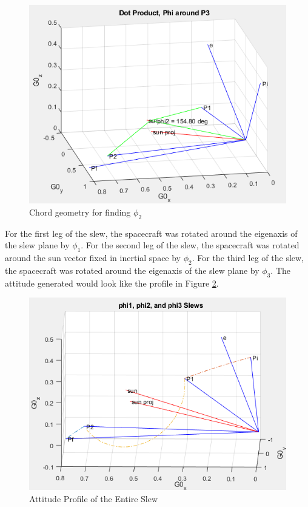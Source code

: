 \documentclass[letterpaper, preprint, paper,11pt]{AAS}	%
\begin{document}
			\begin{figure}[H]
				\label{fig:phi2_geometry}
				\includegraphics[width=6.25in]{figures/chord_geometry_phi2.png}
				\caption{Chord geometry for finding $\phi_2$}
			\end{figure}
		
		For the first leg of the slew, the spacecraft was rotated around the eigenaxis of the slew plane by $\phi_1$. For the second leg of the slew, the spacecraft was rotated around the sun vector fixed in inertial space by $\phi_2$. For the third leg of the slew, the spacecraft was rotated around the eigenaxis of the slew plane by $\phi_3$. The attitude generated would look like the profile in Figure \ref{fig:phi1_phi2_phi3}. 
		
			\begin{figure}[H]
				\label{fig:phi1_phi2_phi3}
				\includegraphics[width=6.25in]{figures/phi1_phi2_phi3.png}
				\caption{Attitude Profile of the Entire Slew}
			\end{figure}
		
\end{document}
